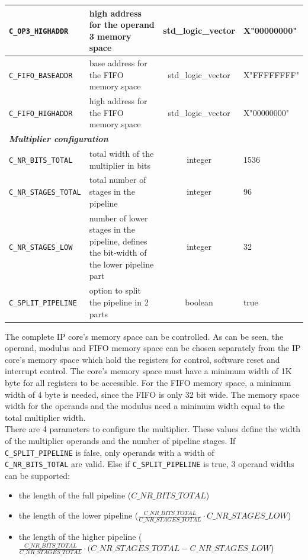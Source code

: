 \begin{center}
\begin{tabular}{|l|p{6.5cm}|c|l|}
		\hline
		\verb|C_OP3_HIGHADDR| & high address for the operand 3 memory space & std\_logic\_vector & X"00000000" \bigstrut\\
		\hline
		\verb|C_FIFO_BASEADDR| & base address for the FIFO memory space & std\_logic\_vector & X"FFFFFFFF" \bigstrut\\
		\hline
		\verb|C_FIFO_HIGHADDR| & high address for the FIFO memory space & std\_logic\_vector & X"00000000" \bigstrut\\
		\hline
		\multicolumn{4}{|l|}{\textit{\textbf{Multiplier configuration}}} \\
		\hline
		\verb|C_NR_BITS_TOTAL| & total width of the multiplier in bits & integer & 1536\bigstrut\\
		\hline
		\verb|C_NR_STAGES_TOTAL| & total number of stages in the pipeline & integer & 96\bigstrut\\
		\hline
		\verb|C_NR_STAGES_LOW| & number of lower stages in the pipeline, defines the bit-width of the lower pipeline part & integer & 32 \bigstrut\\
		\hline
		\verb|C_SPLIT_PIPELINE| & option to split the pipeline in 2 parts & boolean & true \bigstrut\\
		\hline
	\end{tabular}%
\end{center}

The complete IP core's memory space can be controlled. As can be seen, the operand, modulus and FIFO memory space can be
chosen separately from the IP core's memory space which hold the registers for control, software reset and interrupt
control. The core's memory space must have a minimum width of 1K byte for all registers to be accessible. For the FIFO
memory space, a minimum width of 4 byte is needed, since the FIFO is only 32 bit wide. The memory space width for the
operands and the modulus need a minimum width equal to the total multiplier width.\\

There are 4 parameters to configure the multiplier. These values define the width of the multiplier operands and the
number of pipeline stages. If \verb|C_SPLIT_PIPELINE| is false, only operands with a width of\\\verb|C_NR_BITS_TOTAL| are
valid. Else if \verb|C_SPLIT_PIPELINE| is true, 3 operand widths can be supported:
\begin{itemize}
  \item the length of the full pipeline ($C\_NR\_BITS\_TOTAL$)
  \item the length of the lower pipeline ($\frac{C\_NR\_BITS\_TOTAL}{C\_NR\_STAGES\_TOTAL} \cdot C\_NR\_STAGES\_LOW $)
  \item the length of the higher pipeline ($\frac{C\_NR\_BITS\_TOTAL}{C\_NR\_STAGES\_TOTAL} \cdot (C\_NR\_STAGES\_TOTAL - C\_NR\_STAGES\_LOW$)
\end{itemize}

